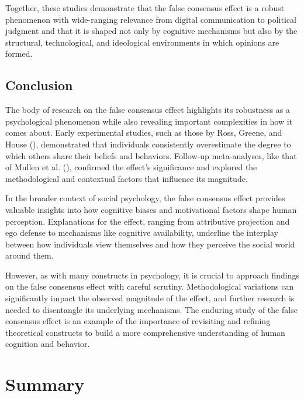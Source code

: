 \documentclass[
  letterpaper,
]{book}
\begin{document}
Together, these studies demonstrate that the false consensus effect is a
robust phenomenon with wide-ranging relevance from digital communication
to political judgment and that it is shaped not only by cognitive
mechanisms but also by the structural, technological, and ideological
environments in which opinions are formed.

\section{Conclusion}\label{conclusion-1}

The body of research on the false consensus effect highlights its
robustness as a psychological phenomenon while also revealing important
complexities in how it comes about. Early experimental studies, such as
those by Ross, Greene, and House (),
demonstrated that individuals consistently overestimate the degree to
which others share their beliefs and behaviors. Follow-up meta-analyses,
like that of Mullen et al. (),
confirmed the effect's significance and explored the methodological and
contextual factors that influence its magnitude.

In the broader context of social psychology, the false consensus effect
provides valuable insights into how cognitive biases and motivational
factors shape human perception. Explanations for the effect, ranging
from attributive projection and ego defense to mechanisms like cognitive
availability, underline the interplay between how individuals view
themselves and how they perceive the social world around them.

However, as with many constructs in psychology, it is crucial to
approach findings on the false consensus effect with careful scrutiny.
Methodological variations can significantly impact the observed
magnitude of the effect, and further research is needed to disentangle
its underlying mechanisms. The enduring study of the false consensus
effect is an example of the importance of revisiting and refining
theoretical constructs to build a more comprehensive understanding of
human cognition and behavior.


\chapter*{\texorpdfstring{{Summary}}{Summary}}\label{summary}
\end{document}
